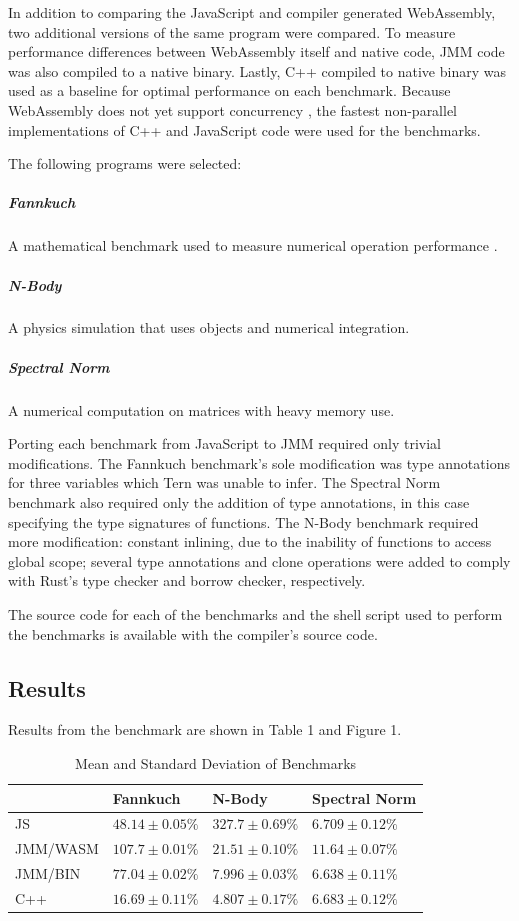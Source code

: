 \documentclass[12pt]{article}
\begin{document}
	In addition to comparing the JavaScript and compiler generated WebAssembly, two additional versions of the same program were compared. To measure performance differences between WebAssembly itself and native code, JMM code was also compiled to a native binary. Lastly, C++ compiled to native binary was used as a baseline for optimal performance on each benchmark. Because WebAssembly does not yet support concurrency \cite{Haas2017}, the fastest non-parallel implementations of C++ and JavaScript code were used for the benchmarks. 
	
	The following programs were selected:
	\subparagraph*{Fannkuch} A mathematical benchmark used to measure numerical operation performance \cite{Anderson_performinglisp}.
	\subparagraph*{N-Body} A physics simulation that uses objects and numerical integration.
	\subparagraph*{Spectral Norm} A numerical computation on matrices with heavy memory use.

	Porting each benchmark from JavaScript to JMM required only trivial modifications. The Fannkuch benchmark's sole modification was type annotations for three variables which Tern was unable to infer. The Spectral Norm benchmark also required only the addition of type annotations, in this case specifying the type signatures of functions. The N-Body benchmark required more modification: constant inlining, due to the inability of functions to access global scope; several type annotations and clone operations were added to comply with Rust's type checker and borrow checker, respectively.
	
	The source code for each of the benchmarks and the shell script used to perform the benchmarks is available with the compiler's source code.
	
	\subsection{Results}
	
	Results from the benchmark are shown in Table 1 and Figure 1.
	
	\begin{table}[h]
		\centering
		\label{my-label}
		\begin{tabular}{llll}
			\textbf{} & \textbf{Fannkuch}  & \textbf{N-Body}     & \textbf{Spectral Norm} \\ \hline
			JS        & $48.14 \pm 0.05\%$ & $ 327.7 \pm 0.69\%$ & $ 6.709 \pm 0.12\%$    \\
			JMM/WASM  & $107.7 \pm 0.01\%$ & $ 21.51 \pm 0.10\%$ & $ 11.64 \pm 0.07\%$    \\
			JMM/BIN   & $77.04 \pm 0.02\%$ & $7.996 \pm 0.03\%$  & $ 6.638 \pm 0.11\%$    \\
			C++       & $16.69 \pm 0.11\%$ & $4.807 \pm 0.17\%$  & $ 6.683 \pm 0.12\%$   
		\end{tabular}
		\caption{Mean and Standard Deviation of Benchmarks}	
	\end{table} 
\end{document}

